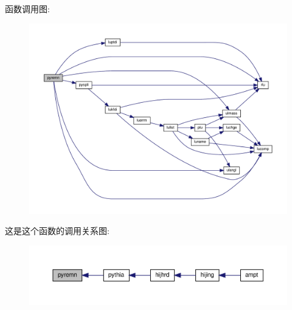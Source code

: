 函数调用图\+:
\nopagebreak
\begin{figure}[H]
\begin{center}
\leavevmode
\includegraphics[width=350pt]{pyremn_8f90_aec11e5150c39912f06575d8f61a5d250_cgraph}
\end{center}
\end{figure}
这是这个函数的调用关系图\+:
\nopagebreak
\begin{figure}[H]
\begin{center}
\leavevmode
\includegraphics[width=350pt]{pyremn_8f90_aec11e5150c39912f06575d8f61a5d250_icgraph}
\end{center}
\end{figure}
